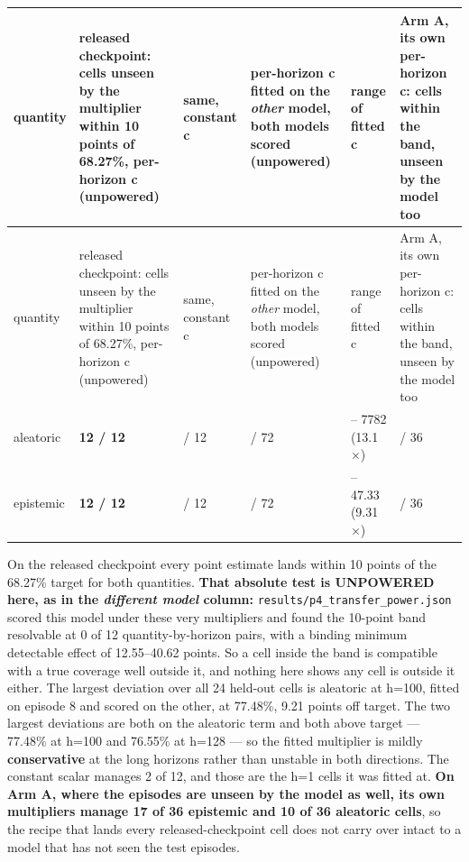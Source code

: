 \documentclass[10pt]{article}
\begin{document}
\begingroup\small
\begin{longtable}{>{\raggedright\arraybackslash}p{}>{\raggedright\arraybackslash}p{}>{\raggedright\arraybackslash}p{}>{\raggedright\arraybackslash}p{}>{\raggedright\arraybackslash}p{}>{\raggedright\arraybackslash}p{}}
\toprule quantity & released checkpoint: cells unseen by the multiplier within 10 points of 68.27\%, per-horizon c (unpowered) & same, constant c & per-horizon c fitted on the \emph{other} model, both models scored (unpowered) & range of fitted c & Arm A, its own per-horizon c: cells within the band, unseen by the model too \\ \midrule\endfirsthead
\toprule quantity & released checkpoint: cells unseen by the multiplier within 10 points of 68.27\%, per-horizon c (unpowered) & same, constant c & per-horizon c fitted on the \emph{other} model, both models scored (unpowered) & range of fitted c & Arm A, its own per-horizon c: cells within the band, unseen by the model too \\ \midrule\endhead
\bottomrule\endlastfoot
aleatoric & \textbf{12 /\allowbreak{} 12} & 2 /\allowbreak{} 12 & 0 /\allowbreak{} 72 & 592.6 -- 7782 (13.1$\times$) & 10 /\allowbreak{} 36 \\
epistemic & \textbf{12 /\allowbreak{} 12} & 2 /\allowbreak{} 12 & 12 /\allowbreak{} 72 & 5.082 -- 47.33 (9.31$\times$) & 17 /\allowbreak{} 36 \\
\end{longtable}\endgroup

On the released checkpoint every point estimate lands within 10 points of the 68.27\% target for both quantities. \textbf{That absolute test is UNPOWERED here, as in the \emph{different model} column:} \texttt{results/\allowbreak{}p4\_\allowbreak{}transfer\_\allowbreak{}power\allowbreak{}.json} scored this model under these very multipliers and found the 10-point band resolvable at 0 of 12 quantity-by-horizon pairs, with a binding minimum detectable effect of 12.55--40.62 points. So a cell inside the band is compatible with a true coverage well outside it, and nothing here shows any cell is outside it either. The largest deviation over all 24 held-out cells is aleatoric at h=100, fitted on episode 8 and scored on the other, at 77.48\%, 9.21 points off target. The two largest deviations are both on the aleatoric term and both above target --- 77.48\% at h=100 and 76.55\% at h=128 --- so the fitted multiplier is mildly \textbf{conservative} at the long horizons rather than unstable in both directions. The constant scalar manages 2 of 12, and those are the h=1 cells it was fitted at. \textbf{On Arm A, where the episodes are unseen by the model as well, its own multipliers manage 17 of 36 epistemic and 10 of 36 aleatoric cells}, so the recipe that lands every released-checkpoint cell does not carry over intact to a model that has not seen the test episodes.
\end{document}
